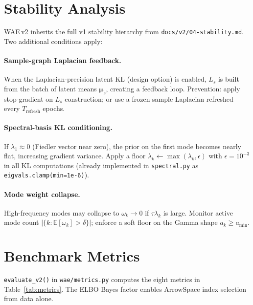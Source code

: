 \documentclass[11pt,a4paper]{article}
\newcommand{\E}{\mathbb{E}}
\newcommand{\bmu}{\bm{\mu}}
\begin{document}
\section{Stability Analysis}
\label{sec:stability}

WAE\,v2 inherits the full v1 stability hierarchy from
\texttt{docs/v2/04-stability.md}.  Two additional conditions apply:

\paragraph{Sample-graph Laplacian feedback.}
When the Laplacian-precision latent KL (design option) is enabled, $L_s$ is
built from the batch of latent means $\bmu_z$, creating a feedback loop.
Prevention: apply stop-gradient on $L_s$ construction; or use a frozen
sample Laplacian refreshed every $T_{\mathrm{refresh}}$ epochs.

\paragraph{Spectral-basis KL conditioning.}
If $\lambda_1\approx 0$ (Fiedler vector near zero), the prior on the first
mode becomes nearly flat, increasing gradient variance.  Apply a floor
$\lambda_k\leftarrow\max(\lambda_k,\epsilon)$ with $\epsilon=10^{-3}$ in all
KL computations (already implemented in \texttt{spectral.py} as
\texttt{eigvals.clamp(min=1e-6)}).

\paragraph{Mode weight collapse.}
High-frequency modes may collapse to $\omega_k\to 0$ if $\tau\lambda_k$ is
large.  Monitor active mode count $|\{k : \E[\omega_k]>\delta\}|$; enforce a
soft floor on the Gamma shape $a_k\ge a_{\min}$.

\section{Benchmark Metrics}
\label{sec:benchmarks}

\texttt{evaluate\_v2()} in \texttt{wae/metrics.py} computes the eight metrics
in Table~\ref{tab:metrics}.  The ELBO Bayes factor enables ArrowSpace index
selection from data alone.
\end{document}
